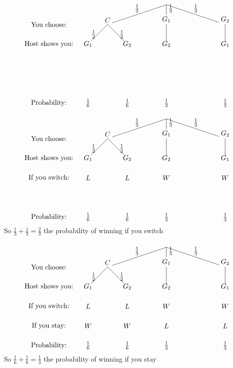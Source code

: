 \documentclass[handout]{beamer}
\theoremstyle{definition}
\begin{document}
\begin{frame}
\[\begin{xy}<1cm,0cm>:
(-6,-1)*{\text{You choose:}};
(-6,-2)*{\text{Host shows you:}};
(-6,-5)*{\text{Probability:}};
(0,0)="0";
(-3,-1)="-31";
(0,-1)="01";
(3,-1)="31";
"0";"-31"*+!D{C}**\dir{-}?*+!D{\frac{1}{3}};
"0";"01"*+!D{G_1}**\dir{-}?*+!DL{\frac{1}{3}};
"0";"31"*+!D{G_2}**\dir{-}?*+!D{\frac{1}{3}};
"-31";(-4,-2)*{G_1}**\dir{-}?*+!R{\frac{1}{2}};
"-31";(-2,-2)*{G_2}**\dir{-}?*+!L{\frac{1}{2}};
"01";(0,-2)*{G_2}**\dir{-};
"31";(3,-2)*{G_1}**\dir{-};
(-4,-5)*{\frac{1}{6}};(-2,-5)*{\frac{1}{6}};
(0,-5)*{\frac{1}{3}};(3,-5)*{\frac{1}{3}};
\end{xy}\]
\end{frame}

\begin{frame}
\[\begin{xy}<1cm,0cm>:
(-6,-1)*{\text{You choose:}};
(-6,-2)*{\text{Host shows you:}};
(-6,-3)*{\text{If you switch:}};
(-6,-5)*{\text{Probability:}};
(0,0)="0";
(-3,-1)="-31";
(0,-1)="01";
(3,-1)="31";
"0";"-31"*+!D{C}**\dir{-}?*+!D{\frac{1}{3}};
"0";"01"*+!D{G_1}**\dir{-}?*+!DL{\frac{1}{3}};
"0";"31"*+!D{G_2}**\dir{-}?*+!D{\frac{1}{3}};
"-31";(-4,-2)*{G_1}**\dir{-}?*+!R{\frac{1}{2}};
"-31";(-2,-2)*{G_2}**\dir{-}?*+!L{\frac{1}{2}};
"01";(0,-2)*{G_2}**\dir{-};
"31";(3,-2)*{G_1}**\dir{-};
(-4,-3)*{L};(-2,-3)*{L};(0,-3)*{W};(3,-3)*{W};
(-4,-5)*{\frac{1}{6}};(-2,-5)*{\frac{1}{6}};
(0,-5)*{\frac{1}{3}};(3,-5)*{\frac{1}{3}};
\end{xy}\]
So $\frac{1}{3}+\frac{1}{3}=\frac{2}{3}$ the
probability of winning if you switch
\end{frame}

\begin{frame}
\[\begin{xy}<1cm,0cm>:
(-6,-1)*{\text{You choose:}};
(-6,-2)*{\text{Host shows you:}};
(-6,-3)*{\text{If you switch:}};
(-6,-4)*{\text{If you stay:}};
(-6,-5)*{\text{Probability:}};
(0,0)="0";
(-3,-1)="-31";
(0,-1)="01";
(3,-1)="31";
"0";"-31"*+!D{C}**\dir{-}?*+!D{\frac{1}{3}};
"0";"01"*+!D{G_1}**\dir{-}?*+!DL{\frac{1}{3}};
"0";"31"*+!D{G_2}**\dir{-}?*+!D{\frac{1}{3}};
"-31";(-4,-2)*{G_1}**\dir{-}?*+!R{\frac{1}{2}};
"-31";(-2,-2)*{G_2}**\dir{-}?*+!L{\frac{1}{2}};
"01";(0,-2)*{G_2}**\dir{-};
"31";(3,-2)*{G_1}**\dir{-};
(-4,-3)*{L};(-2,-3)*{L};(0,-3)*{W};(3,-3)*{W};
(-4,-4)*{W};(-2,-4)*{W};(0,-4)*{L};(3,-4)*{L};
(-4,-5)*{\frac{1}{6}};(-2,-5)*{\frac{1}{6}};
(0,-5)*{\frac{1}{3}};(3,-5)*{\frac{1}{3}};
\end{xy}\]
So $\frac{1}{6}+\frac{1}{6}=\frac{1}{3}$ the
probability of winning if you stay
\end{frame}
\end{document}
